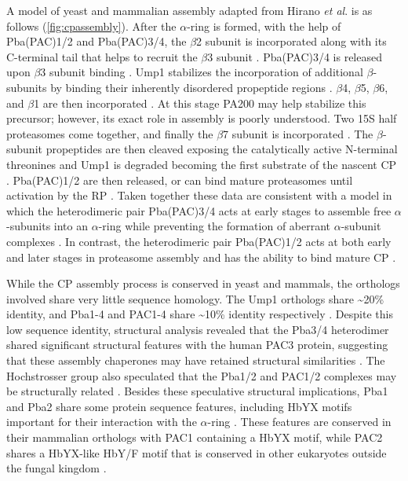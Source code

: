 	A model of yeast and mammalian assembly adapted from Hirano \textit{et al}. is as follows (\ref{fig:cpassembly}).  After the $\alpha$-ring is formed, with the help of Pba(PAC)1/2 and Pba(PAC)3/4, the $\beta$2 subunit is incorporated along with its C-terminal tail that helps to recruit the $\beta$3 subunit \citep{hirano08}. Pba(PAC)3/4 is released upon $\beta$3 subunit binding \citep{hirano08}. Ump1 stabilizes the incorporation of additional $\beta$-subunits by binding their inherently disordered propeptide regions \citep{li07}. $\beta$4, $\beta$5, $\beta$6, and $\beta$1 are then incorporated \citep{hirano08}. At this stage PA200 may help stabilize this precursor; however, its exact role in assembly is poorly understood.  Two 15S half proteasomes come together, and finally the $\beta$7 subunit is incorporated \citep{hirano08}. The $\beta$-subunit propeptides are then cleaved exposing the catalytically active N-terminal threonines and Ump1 is degraded becoming the first substrate of the nascent CP \citep{li07}. Pba(PAC)1/2 are then released, or can bind mature proteasomes until activation by the RP \citep{hirano08}. Taken together these data are consistent with a model in which the heterodimeric pair Pba(PAC)3/4 acts at early stages to assemble free $\alpha$-subunits into an $\alpha$-ring while preventing the formation of aberrant $\alpha$-subunit complexes \citep{hirano08}. In contrast, the heterodimeric pair Pba(PAC)1/2 acts at both early and later stages in proteasome assembly and has the ability to bind mature CP \citep{wani16}.
	
	While the CP assembly process is conserved in yeast and mammals, the orthologs involved share very little sequence homology. The Ump1 orthologs share \textasciitilde{}20\% identity, and Pba1-4 and PAC1-4 share \textasciitilde{}10\% identity respectively \citep{murata09}. Despite this low sequence identity, structural analysis revealed that the Pba3/4 heterodimer shared significant structural features with the human PAC3 protein, suggesting that these assembly chaperones may have retained structural similarities \citep{yashiroda08}. The Hochstrosser group also speculated that the Pba1/2 and PAC1/2 complexes may be structurally related \citep{kusmierczyk11}. Besides these speculative structural implications, Pba1 and Pba2 share some protein sequence features, including HbYX motifs important for their interaction with the $\alpha$-ring \citep{kusmierczyk11}. These features are conserved in their mammalian orthologs with PAC1 containing a HbYX motif, while PAC2 shares a HbYX-like HbY/F motif that is conserved in other eukaryotes outside the fungal kingdom \citep{kusmierczyk11}.
	

